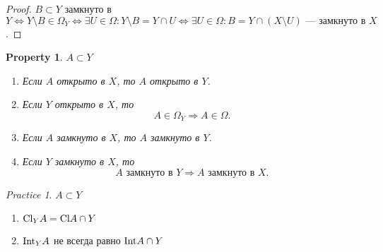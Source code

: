\documentclass[11pt]{book}
\newcommand{\Cl}{{\mathop{\text{\rm Cl}}}}
\newcommand{\Int}{{\mathop{\text{\rm Int}}}}
\theoremstyle{definition}
\theoremstyle{plain}
\theoremstyle{plain}
\newtheorem*{prop}{Property}
\theoremstyle{definition}
\theoremstyle{remark}
\newtheorem*{prac}{Practice}
\begin{document}
\begin{proof}
    $ B \subset Y$ замкнуто в $ Y \Longleftrightarrow  Y \setminus B \in \Omega _Y \Longleftrightarrow \exists U \in \Omega : Y \setminus B = Y \cap U \Longleftrightarrow \exists U \in \Omega : B= Y \cap (X \setminus U) \text{ --- замкнуто в } X$.
\end{proof}
\begin{prop}
    $A \subset Y $
    \begin{enumerate}
	\item Если $ A $ открыто в  $ X$, то $ A$ открыто в  $ Y$.
	\item  Если $ Y$ открыто в  $ X$, то
	    \[
		A \in \Omega _Y \Longrightarrow A \in \Omega
	    .\]
	\item Если $ A$ замкнуто в  $ X$, то $ A$ замкнуто в $ Y$.
	\item Если $ Y $ замкнуто в  $ X$, то
	    \[
		A \text{ замкнуто в } Y \Longrightarrow A  \text{ замкнуто в } X
	    .\]
    \end{enumerate}
\end{prop}
\begin{prac}
    $A \subset Y $
    \begin{enumerate}
	\item $ \Cl_Y A = \Cl A \cap Y$
	\item $ \Int_Y A$ не всегда равно  $ \Int A \cap Y$
    \end{enumerate}
\end{prac}
\end{document}
